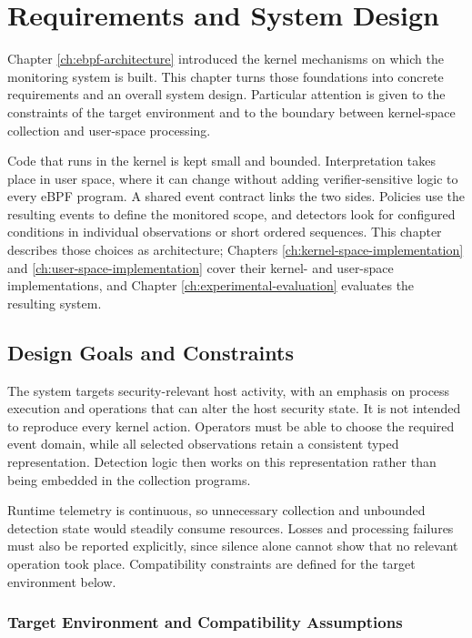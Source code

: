 \chapter{Requirements and System Design}
\label{ch:requirements-system-design}

Chapter \ref{ch:ebpf-architecture} introduced the kernel mechanisms on which the monitoring system is
built. This chapter turns those foundations into concrete requirements and an
overall system design. Particular attention is given to the constraints of the
target environment and to the boundary between kernel-space collection and
user-space processing.

Code that runs in the kernel is kept small and bounded. Interpretation takes
place in user space, where it can change without adding verifier-sensitive
logic to every eBPF program. A shared event contract links the two sides.
Policies use the resulting events to define the monitored scope, and detectors
look for configured conditions in individual observations or short ordered
sequences. This chapter describes those choices as architecture; Chapters \ref{ch:kernel-space-implementation}
and \ref{ch:user-space-implementation} cover their kernel- and user-space implementations, and Chapter \ref{ch:experimental-evaluation}
evaluates the resulting system.

\section{Design Goals and Constraints}
\label{sec:design-goals-constraints}

The system targets security-relevant host activity, with an emphasis on
process execution and operations that can alter the host security state. It is
not intended to reproduce every kernel action. Operators must be able to choose
the required event domain, while all selected observations retain a consistent
typed representation. Detection logic then works on this representation rather
than being embedded in the collection programs.

Runtime telemetry is continuous, so unnecessary collection and unbounded
detection state would steadily consume resources. Losses and processing
failures must also be reported explicitly, since silence alone cannot show that
no relevant operation took place. Compatibility constraints are defined for the
target environment below.

\subsection{Target Environment and Compatibility Assumptions}
\label{subsec:target-environment-assumptions}

